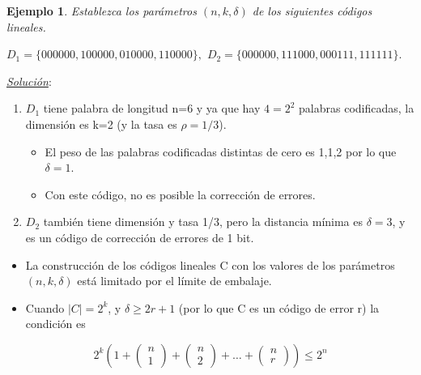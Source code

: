 \documentclass{beamer}
\theoremstyle{plain}
\theoremstyle{example}
\theoremstyle{example}
\newtheorem{ejemplo} [Ejemplo] {Ejemplo}
\begin{document}
\begin{frame}  \small  
\begin{ejemplo}
Establezca los parámetros $(n, k, \delta)$ de los siguientes códigos lineales.

\begin{center}
$D_1 = \{000000,100000,010000,110000\},$
$D_2 = \{000000,111000,000111,111111\}.$
\end{center}
\end{ejemplo}

\textit{\underline{Solución}}:\\
\vspace{0.3cm}
\begin{enumerate}
\item $D_1$ tiene palabra de longitud n=6 y ya que hay $4 = 2^2$ palabras codificadas, la dimensión es k=2 (y la tasa es $\rho=1/3$). 

\begin{itemize}
\item El peso de las palabras codificadas distintas de cero es 1,1,2 por lo que $\delta=1$.
\item Con este código, no es posible la corrección de errores. 
\end{itemize}

\item $D_2$ también tiene dimensión y tasa 1/3, pero la distancia mínima es $\delta = 3$, y es un código de corrección de errores de 1 bit.


\end{enumerate}


\end{frame} 
\begin{frame}  \small  

\begin{itemize}
\item La construcción de los códigos lineales C con los valores de los parámetros $(n,k,\delta)$ está limitado por el límite de embalaje. 
\item Cuando $|C| = 2^k$, y $\delta  \geq 2r + 1$ (por lo que C es un código de error r) la condición es 

\end{itemize}



\[
 2^k \left( 1+ 
            \left( \begin{array}{c}
                  n \\
                  1       
           			\end{array}
    		\right) + 
    		\left( \begin{array}{c}
                  n  \\
                  2      
           			\end{array}
    		\right)+ \ldots + 
              \left( \begin{array}{c}
                  n \\
                  r      
           			\end{array}
    		\right)     		    		
    \right)    	\leq 2^{n}    		
\]


\end{frame} 
\end{document}
